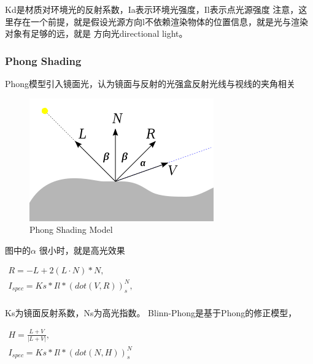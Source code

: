 Kd是材质对环境光的反射系数，Ia表示环境光强度，Il表示点光源强度
注意，这里存在一个前提，就是假设光源方向l不依赖渲染物体的位置信息，就是光与渲染对象有足够的远，就是
方向光directional light。

\subsubsection{Phong Shading}
Phong模型引入镜面光，认为镜面与反射的光强盒反射光线与视线的夹角相关

\begin{figure}[h]
    \centering
    \includegraphics[width=\textwidth]{images/phong-shading-model.png}
    \caption{Phong Shading Model}
\end{figure}

图中的$\alpha$ 很小时，就是高光效果

\begin{math}
    \begin{aligned}
        R = -L + 2(L \cdot N) * N, \\
        I_{spec}=Ks * Il * (dot(V, R))^N_{s}, \\
    \end{aligned}
\end{math}

Ks为镜面反射系数，Ns为高光指数。
Blinn-Phong是基于Phong的修正模型，

\begin{math}
    \begin{aligned}
        H = \frac{L + V}{|L + V|}, \\
        I_{spec} = Ks * Il * (dot(N, H))^N_{s}
    \end{aligned}
\end{math}

